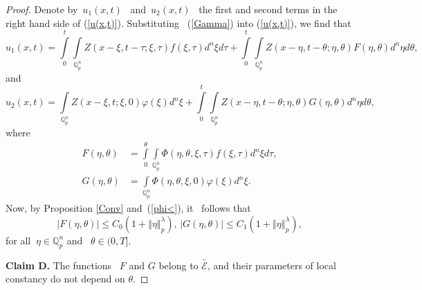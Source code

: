 \documentclass{amsart}\usepackage{amsfonts}
\theoremstyle{plain}
\numberwithin{equation}{section}
\begin{document}
\begin{proof}
Denote by\ $u_{1}(x,t)$ \ and\ $u_{2}(x,t)$ \ the first and second terms in
the right hand side of (\ref{u(x,t)}). Substituting \ (\ref{Gamma}) into
(\ref{u(x,t)}), we find that\[
u_{1}(x,t)={\displaystyle\int\limits_{0}^{t}}
{\displaystyle\int\limits_{\mathbb{Q}_{p}^{n}}}
Z(x-\xi,t-\tau;\xi,\tau)f(\xi,\tau)d^{n}\xi d\tau+{\displaystyle\int\limits_{0}^{t}}
{\displaystyle\int\limits_{\mathbb{Q}_{p}^{n}}}
Z(x-\eta,t-\theta;\eta,\theta)F(\eta,\theta)d^{n}\eta d\theta,
\]
and\[
u_{2}(x,t)={\displaystyle\int\limits_{\mathbb{Q}_{p}^{n}}}
Z(x-\xi,t;\xi,0)\varphi(\xi)d^{n}\xi+{\displaystyle\int\limits_{0}^{t}}
{\displaystyle\int\limits_{\mathbb{Q}_{p}^{n}}}
Z(x-\eta,t-\theta;\eta,\theta)G(\eta,\theta)d^{n}\eta d\theta,
\]
where\begin{align}
F(\eta,\theta)  &  ={\displaystyle\int\limits_{0}^{\theta}}
{\displaystyle\int\limits_{\mathbb{Q}_{p}^{n}}}
\Phi(\eta,\theta,\xi,\tau)f(\xi,\tau)d^{n}\xi d\tau,\label{FG0}\\
G(\eta,\theta)  &  ={\displaystyle\int\limits_{\mathbb{Q}_{p}^{n}}}
\Phi(\eta,\theta,\xi,0)\varphi(\xi)d^{n}\xi. \label{FG}\end{align}
Now, by Proposition \ref{Conv} and\ (\ref{phi<}), it \ follows that\[
\left\vert F(\eta,\theta)\right\vert \leq C_{0}(1+\left\Vert \eta\right\Vert
_{p}^{\lambda})\text{, \ \ \ }\left\vert G(\eta,\theta)\right\vert \leq
C_{1}(1+\left\Vert \eta\right\Vert _{p}^{\lambda}),
\]
for all $\ \eta\in\mathbb{Q}_{p}^{n}$ and \ $\theta\in(0,T]$.

\textbf{Claim D.} The functions \ $F$ and $G$ belong to $\widetilde
{\mathcal{E}\text{,}}$ and their parameters of local constancy do not depend
on $\theta$.


\end{proof}
\end{document}
